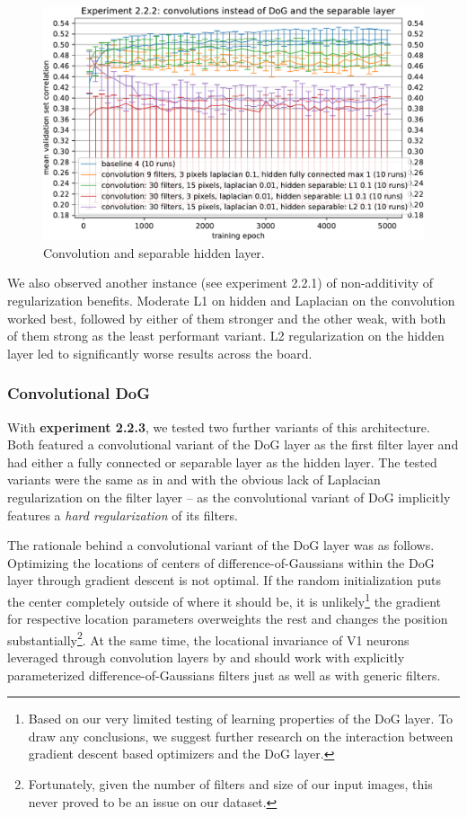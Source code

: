 \begin{figure}[H]
    \centering
    \includegraphics[width=1\textwidth]{../figures/05_2_2_2}
    \caption[Experiment 2.2.2]{Convolution and separable hidden layer.}
    \label{fig:5.2.2.2}
\end{figure}

We also observed another instance (see experiment 2.2.1) of non-additivity of regularization benefits. Moderate L1 on hidden and Laplacian on the convolution worked best, followed by either of them stronger and the other weak, with both of them strong as the least performant variant. L2 regularization on the hidden layer led to significantly worse results across the board.

\subsubsection{Convolutional DoG}

With \textbf{experiment 2.2.3}, we tested two further variants of this architecture. Both featured a convolutional variant of the DoG layer as the first filter layer and had either a fully connected or separable layer as the hidden layer. The tested variants were the same as in  and  with the obvious lack of Laplacian regularization on the filter layer -- as the convolutional variant of DoG implicitly features a \textit{hard regularization} of its filters.

The rationale behind a convolutional variant of the DoG layer was as follows. Optimizing the locations of centers of difference-of-Gaussians within the DoG layer through gradient descent is not optimal. If the random initialization puts the center completely outside of where it should be, it is unlikely\footnote{Based on our very limited testing of learning properties of the DoG layer. To draw any conclusions, we suggest further research on the interaction between gradient descent based optimizers and the DoG layer.} the gradient for respective location parameters overweights the rest and changes the position substantially\footnote{Fortunately, given the number of filters and size of our input images, this never proved to be an issue on our dataset.}. At the same time, the locational invariance of V1 neurons leveraged through convolution layers by \citeauthor{klindt} and \citeauthor{ecker} should work with explicitly parameterized difference-of-Gaussians filters just as well as with generic filters.


